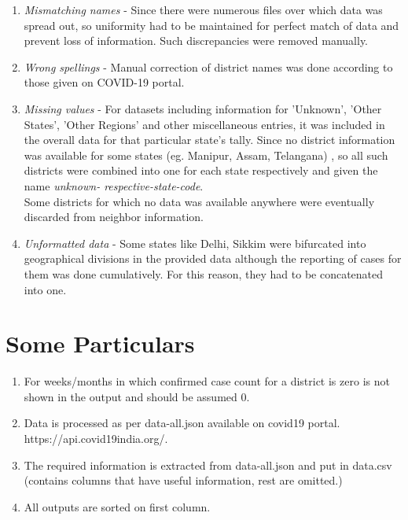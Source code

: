 \documentclass[11pt]{article}
\begin{document}
\begin{enumerate}

\item \textit{Mismatching names} - Since there were numerous files over which data was spread out, so uniformity had to be maintained for perfect match of data and prevent loss of information. Such discrepancies were removed manually.

\item \textit{Wrong spellings} - Manual correction of district names was done according to those given on COVID-19 portal.

\item \textit{Missing values} - For datasets including information for 'Unknown', 'Other States', 'Other Regions' and other miscellaneous entries, it was included in the overall data for that particular state's tally. Since no district information was available for some states (eg. Manipur, Assam, Telangana) , so all such districts were combined into one for each state respectively and given the name \textit{ unknown- respective-state-code}. \\ 
Some districts for which no data was available anywhere were eventually discarded from neighbor information.

\item \textit{Unformatted data} - Some states like Delhi, Sikkim were bifurcated into geographical divisions in the provided data although the reporting of cases for them was done cumulatively. For this reason, they had to be concatenated into one.  
\end{enumerate}

\section{Some Particulars}
\begin{enumerate}
\item For weeks/months in which confirmed case count for a district is zero is not shown in the output and should be assumed 0.

\item Data is processed as per data-all.json available on covid19 portal.\\
https://api.covid19india.org/.

\item The required information is extracted from data-all.json and put in data.csv (contains columns that have useful information, rest are omitted.)

\item All outputs are sorted on first column.

\end{enumerate}
\end{document}
